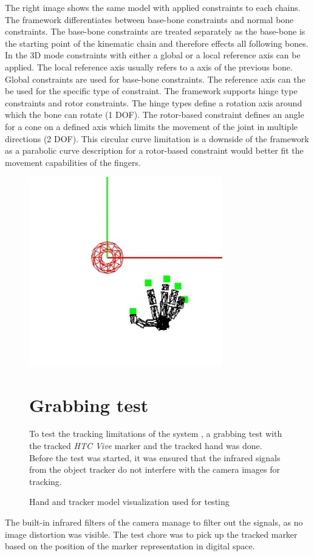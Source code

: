 The right image shows the same model with applied constraints to each chains. The framework differentiates between base-bone constraints and normal bone constraints. The base-bone constraints are treated separately as the base-bone is the starting point of the kinematic chain and therefore effects all following bones. In the 3D mode constraints with either a global or a local reference axis can be applied. The local reference axis usually refers to a axis of the previous bone. Global constraints are used for base-bone constraints. The reference axis can the be used for the specific type of constraint. The framework supports hinge type constraints and rotor constraints. The hinge types define a rotation axis around which the bone can rotate (1 DOF). The rotor-based constraint defines an angle for a cone on a defined axis which limits the movement of the joint in multiple directions (2 DOF). This circular curve limitation is a downside of the framework as a parabolic curve description for a rotor-based constraint would better fit the movement capabilities of the fingers.\begin{figure}[H]
\centering
\includegraphics[width=0.75\textwidth]{images/Hand_rendering_view.png}
\caption{Hand and tracker model visualization used for testing}
\label{img:hand_rendering} 
\section{Grabbing test}
To test the tracking limitations of the system , a grabbing test with the tracked \textit{HTC Vive} marker and the tracked hand was done.
Before the test was started, it was ensured that the infrared signals from the object tracker do not interfere with the camera images for tracking. 

\end{figure}The built-in infrared filters of the camera manage to filter out the signals, as no image distortion was visible. The test chore was to pick up the tracked marker based on the position of the marker representation in digital space.
